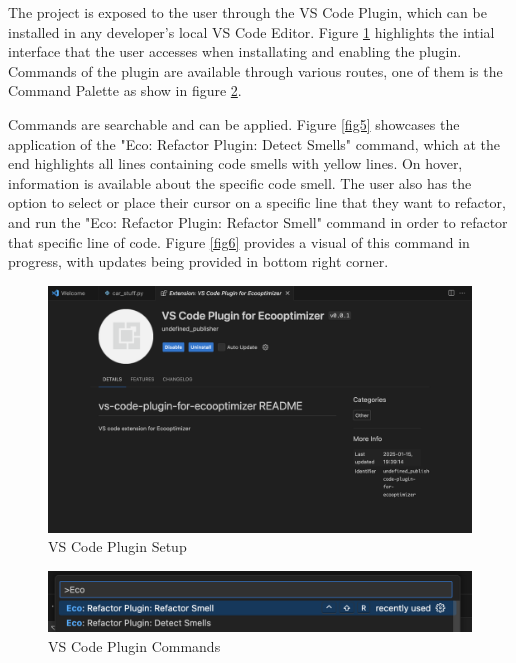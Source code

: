 \documentclass[12pt, titlepage]{article}
\begin{document}
The project is exposed to the user through the VS Code Plugin, which can be installed 
in any developer's local VS Code Editor. Figure \ref{fig3} highlights the intial interface that 
the user accesses when installating and enabling the plugin. Commands of the plugin are 
available through various routes, one of them is the Command Palette as show in figure \ref{fig4}.

Commands are searchable and can be applied. Figure \ref{fig5} showcases the application of the 
"Eco: Refactor Plugin: Detect Smells" command, which at the end highlights all lines containing 
code smells with yellow lines. On hover, information is available about the specific code smell.
The user also has the option to select or place their cursor on a specific line that they want 
to refactor, and run the "Eco: Refactor Plugin: Refactor Smell" command in order to refactor that 
specific line of code. Figure \ref{fig6} provides a visual of this command in progress, with updates
being provided in bottom right corner.

\begin{figure}[H]
  \centering
  \includegraphics[width=\textwidth]{../../Images/VSPlugin.png}
  \caption{VS Code Plugin Setup}
  \label{fig3}
  \end{figure}
  
  \begin{figure}[H]
  \centering
  \includegraphics[width=\textwidth]{../../Images/VSPluginCommands.png}
  \caption{VS Code Plugin Commands}
  \label{fig4}
  \end{figure}
  
\end{document}

